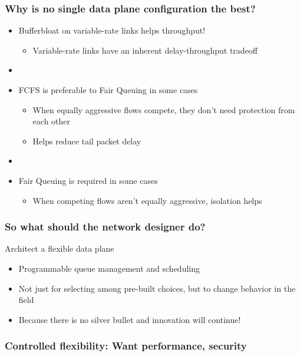 \begin{Large}
\begin{frame}[plain]
\end{frame}

\begin{frame}[plain]
\frametitle{Why is no single data plane configuration the best?}
\begin{itemize}
\item Bufferbloat on variable-rate links helps throughput!
      \begin{itemize}
      \item Variable-rate links have an inherent delay-throughput tradeoff
      \end{itemize} 

\item[] 

\item FCFS is preferable to Fair Queuing in some cases
      \begin{itemize}
      \item When equally aggressive flows compete, they don't need
        protection from each other
        \item Helps reduce tail packet delay
      \end{itemize}

\item[]

\item Fair Queuing is required in some cases
      \begin{itemize}      
      \item When competing flows aren't equally aggressive,
        isolation helps
      \end{itemize}
\end{itemize}
\end{frame}

\begin{frame}[plain]
\frametitle{So what should the network designer do?}
Architect a flexible data plane
\begin{itemize}
\item Programmable queue management and scheduling
\item Not just for selecting among pre-built choices, but to change
  behavior in the field
\item Because there is no silver bullet and innovation will continue!
\end{itemize}
\end{frame}

\begin{frame}[plain]
\frametitle{Controlled flexibility: Want performance, security}


\end{frame}
\end{Large}
